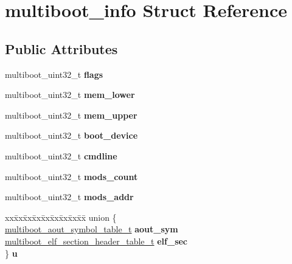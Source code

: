 \hypertarget{structmultiboot__info}{}\section{multiboot\+\_\+info Struct Reference}
\label{structmultiboot__info}
\subsection*{Public Attributes}
\begin{DoxyCompactItemize}
\item 
\mbox{\label{structmultiboot__info_aa562865bc325fd785c9fa4c5056294f3}} 
multiboot\+\_\+uint32\+\_\+t {\bfseries flags}
\item 
\mbox{\label{structmultiboot__info_aa3503176ee0d132ef98537fa0b36ff09}} 
multiboot\+\_\+uint32\+\_\+t {\bfseries mem\+\_\+lower}
\item 
\mbox{\label{structmultiboot__info_a87db5803d5a79490b2bf32cb8e9a05c9}} 
multiboot\+\_\+uint32\+\_\+t {\bfseries mem\+\_\+upper}
\item 
\mbox{\label{structmultiboot__info_ac7dd626a05c9ba62d55ea8a7a254de80}} 
multiboot\+\_\+uint32\+\_\+t {\bfseries boot\+\_\+device}
\item 
\mbox{\label{structmultiboot__info_a0f2f05f69c69c615bf2b4820d357cf36}} 
multiboot\+\_\+uint32\+\_\+t {\bfseries cmdline}
\item 
\mbox{\label{structmultiboot__info_aebdafce31f94277d138202f7b1ec35cc}} 
multiboot\+\_\+uint32\+\_\+t {\bfseries mods\+\_\+count}
\item 
\mbox{\label{structmultiboot__info_a854bdbfa7b23c9c3dfa0bfc155ef8242}} 
multiboot\+\_\+uint32\+\_\+t {\bfseries mods\+\_\+addr}
\item 
\mbox{\label{structmultiboot__info_a92268962967a1ced614ac40367c0bf2e}} 
\begin{tabbing}
xx\=xx\=xx\=xx\=xx\=xx\=xx\=xx\=xx\=\kill
union \{\\
\>\hyperlink{structmultiboot__aout__symbol__table}{multiboot\_aout\_symbol\_table\_t} {\bfseries aout\_sym}\\
\>\hyperlink{structmultiboot__elf__section__header__table}{multiboot\_elf\_section\_header\_table\_t} {\bfseries elf\_sec}\\
\} {\bfseries u}\\


\end{tabbing}
\end{DoxyCompactItemize}
